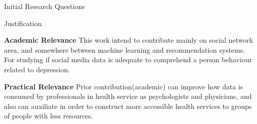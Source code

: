 \documentclass[aspectratio=169,10pt,xcolor={dvipsnames}]{beamer}
\begin{document}
\begin{frame}{Initial Research Questions}
\end{frame}



\begin{frame}{Justification}
  \begin{block}{\textbf{Academic Relevance}}
    This work intend to contribute mainly on social network area, and somewhere between machine learning and recommendation systems. For studying if social media data is adequate to comprehend a person behaviour related to depression.    
  \end{block}

  \begin{block}{\textbf{Practical Relevance}}
    Prior contribution(academic) can improve how data is consumed by professionals in health service as psychologists and physicians, and also can auxiliate in order to construct more accessible health services to groups of people with less resources.
  \end{block}
\end{frame}

\end{document}
